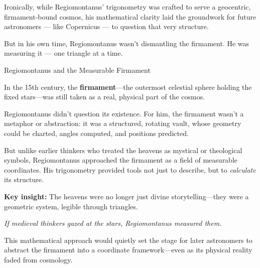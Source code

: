 Ironically, while Regiomontanus' trigonometry was crafted to serve a geocentric, firmament-bound cosmos, his mathematical clarity laid the groundwork for future astronomers — like Copernicus — to question that very structure.

But in his own time, Regiomontanus wasn’t dismantling the firmament. He was measuring it — one triangle at a time.


\begin{HistoricalSidebar}{Regiomontanus and the Measurable Firmament}

  In the 15th century, the \textbf{firmament}—the outermost celestial sphere holding the fixed stars—was still taken as a real, physical part of the cosmos.
  
  Regiomontanus didn’t question its existence. For him, the firmament wasn’t a metaphor or abstraction: it was a structured, rotating vault, whose geometry could be charted, angles computed, and positions predicted.
  
  But unlike earlier thinkers who treated the heavens as mystical or theological symbols, Regiomontanus approached the firmament as a field of measurable coordinates. His trigonometry provided tools not just to describe, but to \emph{calculate} its structure.
  
  \medskip
  
  \textbf{Key insight:} The heavens were no longer just divine storytelling—they were a geometric system, legible through triangles.
  
  \begin{center}
  \emph{If medieval thinkers gazed at the stars, Regiomontanus measured them.}
  \end{center}
  
  This mathematical approach would quietly set the stage for later astronomers to abstract the firmament into a coordinate framework—even as its physical reality faded from cosmology.
  
  \end{HistoricalSidebar}
